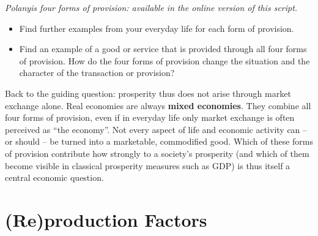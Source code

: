 \documentclass[
  british,
  a4paper,
  DIV=11,
  numbers=noendperiod,
  oneside,
  openany]{scrreprt}
\providecommand{\tightlist}{%
  \setlength{\itemsep}{0pt}\setlength{\parskip}{0pt}}
\begin{document}
\begin{tcolorbox}[enhanced jigsaw, arc=.35mm, bottomrule=.15mm, bottomtitle=1mm, breakable, colback=white, colbacktitle=quarto-callout-caution-color!10!white, colframe=quarto-callout-caution-color-frame, coltitle=black, left=2mm, leftrule=.75mm, opacityback=0, opacitybacktitle=0.6, rightrule=.15mm, title={Interactive exercise -- Polanyi's four forms of provision}, titlerule=0mm, toprule=.15mm, toptitle=1mm]

\emph{Polanyi\textquotesingle s four forms of provision: available in the online version of this script.}

\end{tcolorbox}

\begin{tcolorbox}[enhanced jigsaw, arc=.35mm, bottomrule=.15mm, bottomtitle=1mm, breakable, colback=white, colbacktitle=quarto-callout-caution-color!10!white, colframe=quarto-callout-caution-color-frame, coltitle=black, left=2mm, leftrule=.75mm, opacityback=0, opacitybacktitle=0.6, rightrule=.15mm, title={In-depth questions}, titlerule=0mm, toprule=.15mm, toptitle=1mm]

\begin{itemize}
\tightlist
\item
  Find further examples from your everyday life for each form of
  provision.
\item
  Find an example of a good or service that is provided through all four
  forms of provision. How do the four forms of provision change the
  situation and the character of the transaction or provision?
\end{itemize}

\end{tcolorbox}

Back to the guiding question: prosperity thus does not arise through
market exchange alone. Real economies are always \textbf{mixed
economies}. They combine all four forms of provision, even if in
everyday life only market exchange is often perceived as ``the
economy''. Not every aspect of life and economic activity can -- or
should -- be turned into a marketable, commodified good. Which of these
forms of provision contribute how strongly to a society's prosperity
(and which of them become visible in classical prosperity measures such
as GDP) is thus itself a central economic question.

\section{(Re)production Factors}\label{reproduction-factors}
\end{document}
